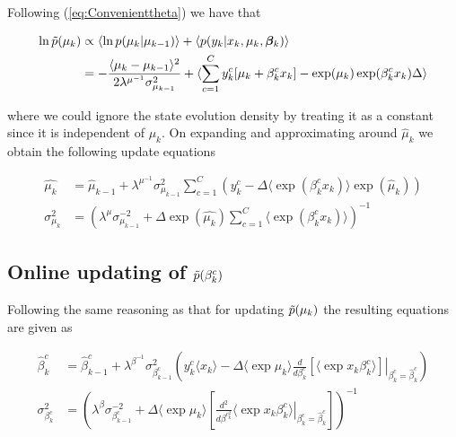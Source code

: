\documentclass{article}
\begin{document}
Following (\ref{eq:Convenienttheta}) we have that

\begin{equation}
\begin{split}
\ln \tilde{p}(\mu_{k}) &\propto \langle \ln p(\mu_k | \mu_{k-1})\rangle + \langle p(y_k | x_{k}, \mu_k, {\bm \beta}_k) \rangle \\
&= - \frac{\langle \mu_{k} - \mu_{k-1} \rangle^2}{2\lambda^{\mu^{-1}}\sigma^2_{\mu_{k-1}}}  + \langle\sum_{c=1}^C y_k^c[\mu_k + \beta^c_kx_k] - \exp(\mu_k)\exp(\beta^c_kx_k)\Delta \rangle
\end{split}
\end{equation}

\noindent where we could ignore the state evolution density by treating it as a constant since it is independent of $\mu_k$.  On expanding and approximating around $\hat{\mu}_{k}$ we obtain the following update equations

\begin{equation}
\begin{split}
\hat{\mu_k} &= \hat{\mu}_{k-1} + \lambda^{\mu^{-1}}\sigma^2_{\mu_{k-1}}\sum_{c=1}^C \left(y^c_k - \Delta \langle \exp(\beta^c_kx_k)\rangle\exp(\hat{\mu}_k) \right)  \\
\sigma^2_{\mu_k} &= \left(\lambda^{\mu}\sigma^{-2}_{\mu_{k-1}} + \Delta\exp(\hat{\mu_{k}}) \sum_{c=1}^C \langle \exp(\beta^c_kx_k)\rangle\right)^{-1}
\end{split}
\end{equation}

\subsection{Online updating of $\tilde{p}(\beta^c_k)$}

Following the same reasoning as that for updating $\tilde{p}(\mu_k)$ the resulting equations are given as

\begin{equation}
\begin{split}
\hat{\beta}^c_k &= \hat{\beta}^c_{k-1} + \lambda^{\beta^{-1}}\sigma^2_{\beta^c_{k-1}}\left(y^c_k\langle x_k \rangle - \Delta\langle \exp \mu_k \rangle \frac{d}{d\beta^c_k}\left. \left[\langle \exp{x_{k}\beta^c_k}\rangle\right] \right| _{\beta^c_k = \hat{\beta}^c_k}  \right) \\
 \sigma^2_{\beta^c_k} &= \left(\lambda^{\beta}\sigma^{-2}_{\beta^c_{k-1}} + \Delta\langle \exp \mu_k \rangle \left[\frac{d^2}{d\beta^{c_k^2}} \left. \langle \exp{x_k\beta^c_k}\rangle \right| _{\beta^c_k = \hat{\beta}^c_k}\right]\right)^{-1}
\end{split}
\end{equation} 	
\end{document}
